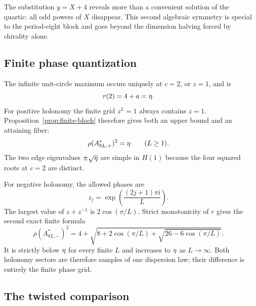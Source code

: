 The substitution $y=X+4$ reveals more than a convenient solution of the
quartic: all odd powers of $X$ disappear.  This second algebraic symmetry is
special to the period-eight block and goes beyond the dimension halving forced
by chirality alone.

\subsection{Finite phase quantization}

The infinite unit-circle maximum occurs uniquely at $c=2$, or $z=1$, and is
\[
 r(2)=4+a=\eta.
\]
For positive holonomy the finite grid $z^L=1$ always contains $z=1$.
Proposition~\ref{prop:finite-bloch} therefore gives both an upper bound and an
attaining fiber:
\begin{equation}
 \rho(A_{8L,+}^{*})^2=\eta
 \qquad(L\geq1).
 \label{eq:positive-finite-exact}
\end{equation}
The two edge eigenvalues $\pm\sqrt{\eta}$ are simple in $H(1)$ because the
four squared roots at $c=2$ are distinct.

For negative holonomy, the allowed phases are
\[
 z_j=\exp\!\left(\frac{(2j+1)\pi\mathrm i}{L}\right).
\]
The largest value of $z+z^{-1}$ is $2\cos(\pi/L)$.  Strict monotonicity of
$r$ gives the second exact finite formula
\begin{equation}
 \rho(A_{8L,-}^{*})^2
 =4+\sqrt{8+2\cos(\pi/L)+
                \sqrt{26-6\cos(\pi/L)}}.
 \label{eq:negative-finite-exact}
\end{equation}
It is strictly below $\eta$ for every finite $L$ and increases to
$\eta$ as $L\to\infty$.  Both holonomy sectors are therefore samples of
one dispersion law; their difference is entirely the finite phase grid.

\subsection{The twisted comparison}
\label{sec:twisted}

